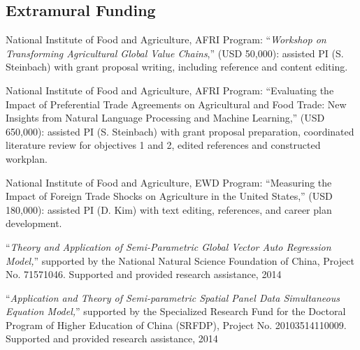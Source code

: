 \documentclass[11 pt,letterpaper]{article}
\renewenvironment{itemize}{
	\begin{list}{}{
			\setlength{\leftmargin}{1.5em}
		}
	}{
	\end{list}
}
\begin{document}
 
 
 
		
 \subsection*{\textbf{Extramural Funding}}
		
\begin{itemize}

\item[-]  National Institute of Food and Agriculture, AFRI Program: ``\textit{Workshop on Transforming Agricultural Global Value Chains},'' (USD 50,000): assisted PI (S. Steinbach) with grant proposal writing, including reference and content editing. 
			
\item [-] National Institute of Food and Agriculture, AFRI Program: “Evaluating the Impact of Preferential Trade Agreements on Agricultural and Food Trade: New Insights from Natural Language Processing and Machine Learning,”  (USD 650,000): assisted PI (S. Steinbach) with grant proposal preparation, coordinated literature review for objectives 1 and 2, edited references and constructed workplan. 
			
\item [-] National Institute of Food and Agriculture, EWD Program: “Measuring the Impact of Foreign Trade Shocks on Agriculture in the United States,” (USD 180,000): assisted PI (D. Kim) with text editing, references, and career plan development. 
			
			
			
 
			
	\item[-] ``\textit{Theory and Application of Semi-Parametric Global Vector Auto Regression Model,}'' supported by the National Natural Science Foundation of China, Project No. 71571046. Supported and provided research assistance, 2014
				
	\item [-] ``\textit{Application and Theory of Semi-parametric Spatial Panel Data Simultaneous Equation Model,}'' supported by the Specialized Research Fund for the Doctoral Program of Higher Education of China (SRFDP), Project No. 20103514110009. Supported and provided research assistance, 2014
				
				
				
\end{itemize}
		
		
 
	
	
\end{document}
